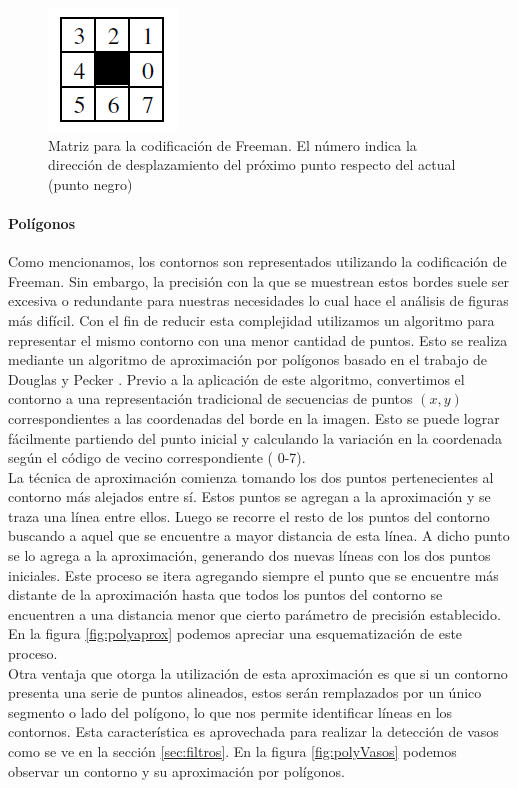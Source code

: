 \begin{figure}[htpb]
\begin{center}
  \includegraphics[scale=0.6]{vision/figures/freeman-codes.png}
\end{center}
  \caption[Matriz para la codificaci\'on de Freeman]{\small Matriz para la codificaci\'on de Freeman. El n\'umero indica la direcci\'on de desplazamiento del pr\'oximo punto respecto del
  actual (punto negro) }
  \label{fig:freeman}
\end{figure}
		
		
	\paragraph{Pol\'igonos}
	Como mencionamos, los contornos son representados utilizando la codificaci\'on de Freeman. Sin embargo, la precisi\'on con la que se muestrean estos bordes suele ser excesiva o redundante para nuestras
	necesidades lo cual hace el an\'alisis de figuras m\'as dif\'icil. Con el fin de reducir esta complejidad utilizamos un algoritmo
	para representar el mismo contorno con una menor cantidad de puntos. Esto se realiza mediante un algoritmo de aproximaci\'on por pol\'igonos
	basado en el trabajo de Douglas y Pecker \cite{dp74}. Previo a la aplicaci\'on de este algoritmo, convertimos el contorno a una representaci\'on
	tradicional de secuencias de puntos $(x,y)$ correspondientes a las 
	coordenadas del borde en la imagen. Esto se puede lograr f\'acilmente partiendo del punto inicial y calculando la variaci\'on en la coordenada seg\'un el c\'odigo de vecino correspondiente ( 0-7).\\
	\indent La t\'ecnica de aproximaci\'on comienza tomando los dos puntos 
	pertenecientes al contorno m\'as alejados entre s\'i. Estos puntos se 
	agregan a la aproximaci\'on y se traza una l\'inea entre ellos.
	Luego se recorre el resto de los puntos del contorno buscando a aquel 
	que se encuentre a mayor distancia de esta l\'inea. A dicho punto se lo 
	agrega a la aproximaci\'on, generando dos nuevas l\'ineas con los dos puntos iniciales. Este proceso se itera agregando siempre el punto que se encuentre m\'as distante de la aproximaci\'on hasta que todos los puntos del contorno se encuentren a una distancia menor que cierto par\'ametro 
	de precisi\'on establecido. En la figura \ref{fig:polyaprox} podemos 
	apreciar una esquematizaci\'on de este proceso.\\
	\indent Otra ventaja que 
	otorga la utilizaci\'on de esta aproximaci\'on es que si un contorno 
	presenta una serie de puntos alineados, estos ser\'an remplazados por 
	un \'unico segmento o lado del pol\'igono, lo que nos permite 
	identificar l\'ineas en los contornos. Esta caracter\'istica es 
	aprovechada para realizar la detecci\'on de vasos como se ve en la  
	secci\'on \ref{sec:filtros}. En la figura \ref{fig:polyVasos} podemos observar un contorno
	y su aproximaci\'on por pol\'igonos.
	
